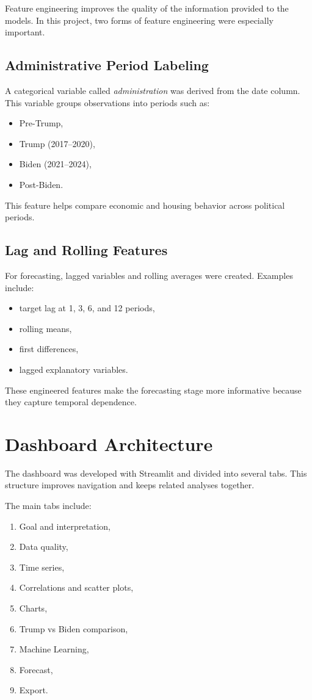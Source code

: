 Feature engineering improves the quality of the information provided to the models.
In this project, two forms of feature engineering were especially important.

\subsection{Administrative Period Labeling}

A categorical variable called \textit{administration} was derived from the date column.
This variable groups observations into periods such as:
\begin{itemize}
\item Pre-Trump,
\item Trump (2017--2020),
\item Biden (2021--2024),
\item Post-Biden.
\end{itemize}

This feature helps compare economic and housing behavior across political periods.

\subsection{Lag and Rolling Features}

For forecasting, lagged variables and rolling averages were created.
Examples include:
\begin{itemize}
\item target lag at 1, 3, 6, and 12 periods,
\item rolling means,
\item first differences,
\item lagged explanatory variables.
\end{itemize}

These engineered features make the forecasting stage more informative because they capture temporal dependence.

\section{Dashboard Architecture}

The dashboard was developed with Streamlit and divided into several tabs.
This structure improves navigation and keeps related analyses together.

The main tabs include:
\begin{enumerate}
\item Goal and interpretation,
\item Data quality,
\item Time series,
\item Correlations and scatter plots,
\item Charts,
\item Trump vs Biden comparison,
\item Machine Learning,
\item Forecast,
\item Export.
\end{enumerate}

